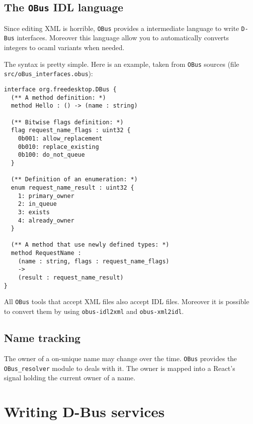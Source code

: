 \documentclass{article}
\newcommand{\obus}{\texttt{OBus}\xspace}
\newcommand{\dbus}{\texttt{D-Bus}\xspace}
\begin{document}
\subsection{The \obus IDL language}

Since editing XML is horrible, \obus provides a intermediate language
to write \dbus interfaces. Moreover this language allow you to
automatically converts integers to ocaml variants when needed.

The syntax is pretty simple. Here is an example, taken from \obus
sources (file \texttt{src/oBus\_interfaces.obus}):

\lstset{language=[Objective]Caml}
\begin{lstlisting}
interface org.freedesktop.DBus {
  (** A method definition: *)
  method Hello : () -> (name : string)

  (** Bitwise flags definition: *)
  flag request_name_flags : uint32 {
    0b001: allow_replacement
    0b010: replace_existing
    0b100: do_not_queue
  }

  (** Definition of an enumeration: *)
  enum request_name_result : uint32 {
    1: primary_owner
    2: in_queue
    3: exists
    4: already_owner
  }

  (** A method that use newly defined types: *)
  method RequestName :
    (name : string, flags : request_name_flags)
    ->
    (result : request_name_result)
}
\end{lstlisting}

All \obus tools that accept XML files also accept IDL files. Moreover
it is possible to convert them by using \texttt{obus-idl2xml} and
\texttt{obus-xml2idl}.

\subsection{Name tracking}
\label{name-tracking}

The owner of a on-unique name may change over the time. \obus provides
the \texttt{OBus\_resolver} module to deals with it. The owner is
mapped into a React's signal holding the current owner of a name.

\section{Writing D-Bus services}
\end{document}
